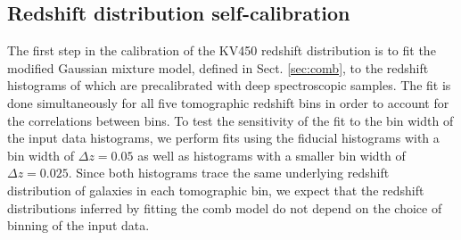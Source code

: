 \documentclass{aa}
\begin{document}
\subsection{Redshift distribution self-calibration}
\label{sec:redshift_calibration}
The first step in the calibration of the KV450 redshift distribution is to fit the modified Gaussian mixture model, defined in Sect. \ref{sec:comb}, to the redshift histograms of \cite{hildebrandt18} which are precalibrated with deep spectroscopic samples. The fit is done simultaneously for all five tomographic redshift bins in order to account for the correlations between bins. To test the sensitivity of the fit to the bin width of the input data histograms, we perform fits using the fiducial histograms with a bin width of $\Delta z = 0.05$ as well as histograms with a smaller bin width of $\Delta z = 0.025$.  Since both histograms trace the same underlying redshift distribution of galaxies in each tomographic bin, we expect that the redshift distributions inferred by fitting the comb model do not depend on the choice of binning of the input data.
\end{document}
